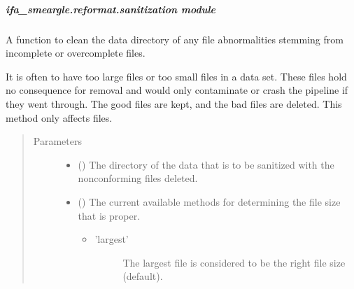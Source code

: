\documentclass[letterpaper,10pt,english]{sphinxmanual}
\begin{document}
\subparagraph{ifa\_smeargle.reformat.sanitization module}
\label{\detokenize{docstrings/ifa_smeargle.reformat.sanitization:module-ifa_smeargle.reformat.sanitization}}\label{\detokenize{docstrings/ifa_smeargle.reformat.sanitization:ifa-smeargle-reformat-sanitization-module}}\label{\detokenize{docstrings/ifa_smeargle.reformat.sanitization::doc}}

\begin{fulllineitems}
\label{\detokenize{docstrings/ifa_smeargle.reformat.sanitization:ifa_smeargle.reformat.sanitization.sanitize_file_size}}
A function to clean the data directory of any file
abnormalities stemming from incomplete or over\sphinxhyphen{}complete files.

It is often to have too large files or too small files in a data
set. These files hold no consequence for removal and would only
contaminate or crash the pipeline if they went through. The
good files are kept, and the bad files are deleted. This method
only affects  files.
\begin{quote}\begin{description}
\item[{Parameters}] \leavevmode\begin{itemize}
\item {} 
 () \textendash{} The directory of the data that is to be sanitized with the
non\sphinxhyphen{}conforming files deleted.

\item {} 
 (\sphinxstyleliteralemphasis{\sphinxupquote{ (}}\sphinxstyleliteralemphasis{\sphinxupquote{)}}) \textendash{} 
The current available methods for determining the file size
that is proper.
\begin{itemize}
\item {} \begin{description}
\item[{’largest’}] \leavevmode
The largest  file is considered
to be the right file size (default).


\end{description}
\end{itemize}
\end{itemize}
\end{description}
\end{quote}
\end{fulllineitems}
\end{document}
